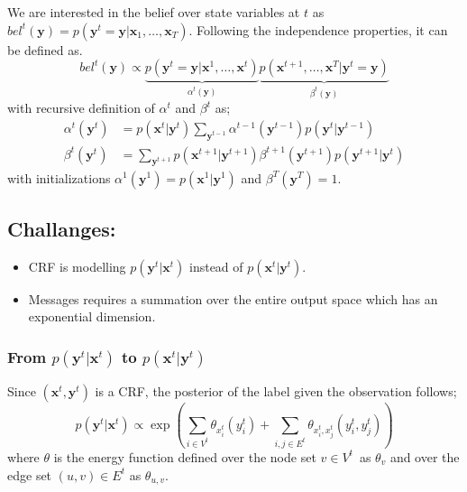 \documentclass[conference]{IEEEtran}
\begin{document}
\noindent We are interested in the belief over state variables at $t$ as $bel^t(\mathbf{y}) = p(\mathbf{y}^t=\mathbf{y}|\mathbf{x}_1,\ldots,\mathbf{x}_T)$. Following the independence properties, it can be defined as.
\begin{equation}
bel^t(\mathbf{y}) \propto  \underbrace{p(\mathbf{y}^t=\mathbf{y}|\mathbf{x}^1,\ldots,\mathbf{x}^t)}_{\alpha^t(\mathbf{y})} \underbrace{p(\mathbf{x}^{t+1},\ldots,\mathbf{x}^T|\mathbf{y}^t=\mathbf{y})}_{\beta^t(\mathbf{y})}
\label{beldec}
\end{equation}
with recursive definition of $\alpha^t$ and $\beta^t$ as;
\begin{equation}
\begin{aligned}
\alpha^t(\mathbf{y}^t) &= p(\mathbf{x}^t|\mathbf{y}^t)\sum_{\mathbf{y}^{t-1}} \alpha^{t-1}(\mathbf{y}^{t-1}) p(\mathbf{y}^{t}|\mathbf{y}^{t-1}) \\
\beta^t(\mathbf{y}^t) &= \sum_{\mathbf{y}^{t+1}} p(\mathbf{x}^{t+1}|\mathbf{y}^{t+1}) \beta^{t+1}(\mathbf{y}^{t+1}) p(\mathbf{y}^{t+1}|\mathbf{y}^{t})
\end{aligned}
\label{mespas}
\end{equation}
\noindent
with initializations $\alpha^1(\mathbf{y}^1)=p(\mathbf{x}^1|\mathbf{y}^1)$ and $\beta^T(\mathbf{y}^T)=1$.

\subsection{Challanges:}
\begin{itemize}
  \item CRF is modelling $p(\mathbf{y}^t|\mathbf{x}^t)$ instead of $p(\mathbf{x}^t|\mathbf{y}^t)$.
  \item Messages requires a summation over the entire output space which has an exponential dimension.
\end{itemize}

\subsubsection{From $p(\mathbf{y}^t|\mathbf{x}^t)$ to $p(\mathbf{x}^t|\mathbf{y}^t)$}
Since $(\mathbf{x}^t,\mathbf{y}^t)$ is a CRF, the posterior of the label given the observation follows; %
\begin{equation}
p(\mathbf{y}^t|\mathbf{x}^t) \propto \exp\left( \sum_{i \in V^t} \theta_{x^t_i}(y^t_i) + \sum_{i,j \in E^t} \theta_{x^t_i,x^t_j}(y^t_i,y^t_j)  \right)
\label{crflogl}
\end{equation}
where $\theta$ is the energy function defined over the node set \mbox{$v \in V^t$ }as $\theta_{v}$ and over the edge set \mbox{$(u,v) \in E^t$} as $\theta_{u,v}$.
\end{document}
